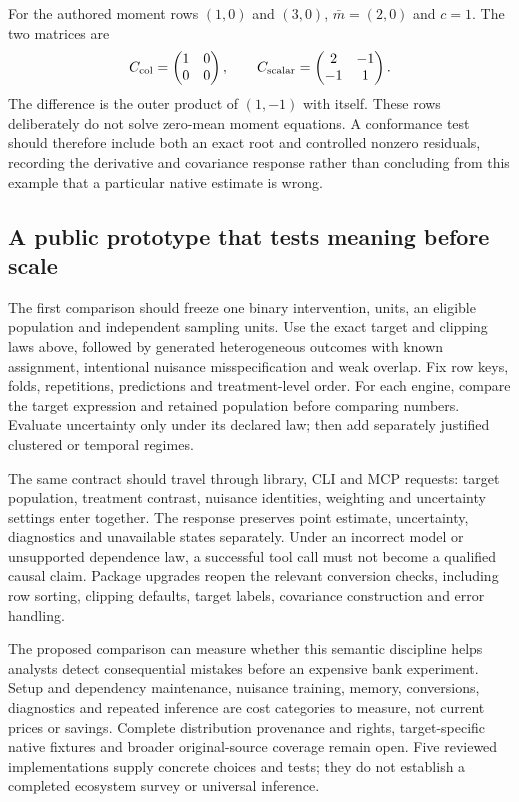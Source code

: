 For the authored moment rows $(1,0)$ and $(3,0)$,
$\bar m=(2,0)$ and $c=1$. The two matrices are
\begin{equation}
 C_{\rm col}=\begin{pmatrix}1&0\\0&0\end{pmatrix},\qquad
 C_{\rm scalar}=\begin{pmatrix}2&-1\\-1&1\end{pmatrix}.
 \label{exec20:pyfx-centering-example}
\end{equation}
The difference is the outer product of $(1,-1)$ with itself. These rows
deliberately do not solve zero-mean moment equations. A conformance test
should therefore include both an exact root and controlled nonzero
residuals, recording the derivative and covariance response rather than
concluding from this example that a particular native estimate is wrong.
\citep{exec20_python_effect_reference}

\subsection{A public prototype that tests meaning before scale}
\label{exec20:pyfx-design}
The first comparison should freeze one binary intervention, units, an
eligible population and independent sampling units. Use the exact target
and clipping laws above, followed by generated heterogeneous outcomes with
known assignment, intentional nuisance misspecification and weak overlap.
Fix row keys, folds, repetitions, predictions and treatment-level order.
For each engine, compare the target expression and retained population
before comparing numbers. Evaluate uncertainty only under its declared law;
then add separately justified clustered or temporal regimes.

The same contract should travel through library, CLI and MCP requests:
target population, treatment contrast, nuisance identities, weighting and
uncertainty settings enter together. The response preserves point estimate,
uncertainty, diagnostics and unavailable states separately. Under an
incorrect model or unsupported dependence law, a successful tool call
must not become a qualified causal claim. Package upgrades reopen the
relevant conversion checks, including row sorting, clipping defaults,
target labels, covariance construction and error handling.

The proposed comparison can measure whether this semantic discipline helps
analysts detect consequential mistakes before an expensive bank experiment.
Setup and dependency maintenance, nuisance training, memory, conversions,
diagnostics and repeated inference are cost categories to measure, not
current prices or savings. Complete distribution provenance and rights,
target-specific native fixtures and broader original-source coverage remain
open. Five reviewed implementations supply concrete choices and tests;
they do not establish a completed ecosystem survey or universal inference.
